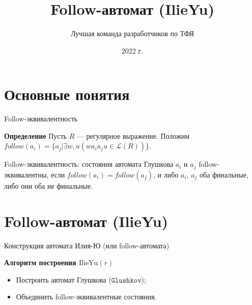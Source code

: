 \documentclass[mathserif]{beamer}
\title[] {Follow-автомат (IlieYu)}
\author[Chipollino]{Лучшая команда разработчиков по ТФЯ} %
\date[] 
{2022 г.}
\newcommand{\Lang}{\mathscr{L}} %
\def\IlieYu{\mathrm{IlieYu}}
\def\Glushkov{\mathtt{Glushkov}}
\begin{document}
\maketitle
\section{Основные понятия}
\begin{frame}{Follow-эквивалентность}
    \begin{block}{\bf Определение}
        Пусть $R$ --- регулярное выражение. Положим $follow(a_{i}) = \{a_{j} | \exists w, u(wa_{i}a_{j}u \in\Lang(R))\}$.

        Follow-эквивалентность: состояния автомата Глушкова $a_{i}$ и $a_{j}$ follow-эквивалентны, если $follow(a_{i}) = follow(a_{j})$, и либо $a_{i}$, $a_{j}$ оба финальные, либо они оба не финальные.
    \end{block} %
\end{frame}

\section{Follow-автомат (IlieYu)}
\begin{frame}{Конструкция автомата Илия-Ю (или follow-автомата)}
    \begin{block}{\bf Алгоритм построения $\IlieYu(r)$}
        \begin{itemize}
            \item Построить автомат Глушкова ($\Glushkov$);
            \item Объединить follow-эквивалентные состояния.
        \end{itemize}
    \end{block} %
\end{frame}
\end{document}
